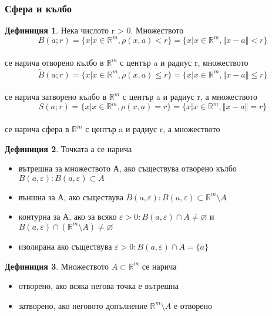 \documentclass[a4paper,fleqn,12pt]{article}
\theoremstyle{definition}
\newtheorem{definition}{Дефиниция}[subsection]
\begin{document}
\subsubsection{Сфера и кълбо}

\begin{definition}
Нека числото r > 0. Множеството \\
$$B(a;r) = \{ x \vert  x \in \mathbb{R}^m, \rho(x,a) <r \} = \{ x\vert  x \in \mathbb{R}^m, \Vert x-a \Vert < r \}$$\\
се нарича отворено кълбо в $\mathbb{R}^m$ с център a и радиус r, множеството \\
$$\widetilde B(a;r) = \{ x \vert  x \in \mathbb{R}^m, \rho(x,a) \leq r \} = \{ x\vert  x \in \mathbb{R}^m, \Vert x-a \Vert \leq r \}$$\\
се нарича затворено кълбо в $\mathbb{R}^m$ с център a и радиус r, а множеството \\
$$S(a;r) = \{ x \vert  x \in \mathbb{R}^m, \rho(x,a) = r \} = \{ x\vert  x \in \mathbb{R}^m, \Vert x-a \Vert = r \}$$\\
се нарича сфера в $\mathbb{R}^m$ с център a и радиус r, а множеството \\
\end{definition}

\begin{definition}
Точката а се нарича
\begin{itemize}
	\item вътрешна за множеството А, ако съществува отворено кълбо $B(a,\varepsilon): B(a,\varepsilon) \subset A$
	\item външна за А, ако съществува $B(a,\varepsilon): B(a,\varepsilon) \subset \mathbb{R}^m \setminus  A$
	\item контурна за А, ако за всяко $\varepsilon > 0: B(a,\varepsilon) \cap A \neq \varnothing $ и \\ $ B(a,\varepsilon) \cap (\mathbb{R}^m \setminus  A) \neq \varnothing$
	\item изолирана ако съществува $\varepsilon > 0: B(a,\varepsilon) \cap A = \{ a \}$
\end{itemize}
	
\end{definition}

\begin{definition}
Множеството $A \subset \mathbb{R}^m $ се нарича 

\begin{itemize}
	\item отворено, ако всяка негова точка е вътрешна 
	\item затворено, ако неговото допълнение  $\mathbb{R}^m \setminus A$ е отворено
\end{itemize}

\end{definition}
\end{document}
